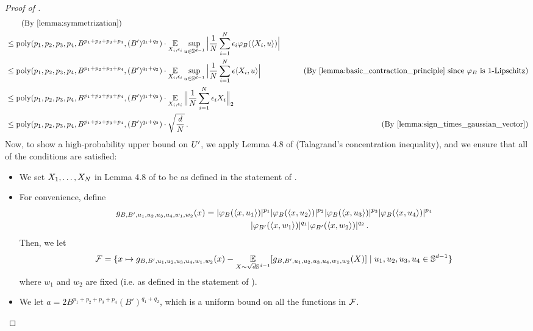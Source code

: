 \begin{proof}[Proof of ]
\begin{align}
& \tag{By \Cref{lemma:symmetrization}} \\
& \leq \poly(p_1, p_2, p_3, p_4, B^{p_1 + p_2 + p_3 + p_4}, (B')^{q_1 + q_2}) \cdot \E_{X_i, \epsilon_i} \sup_{u \in \bbS^{d - 1}} \Big|\frac{1}{N} \sum_{i = 1}^N \epsilon_i \truncB(\langle X_i, u \rangle) \Big| \\
& \leq \poly(p_1, p_2, p_3, p_4, B^{p_1 + p_2 + p_3 + p_4}, (B')^{q_1 + q_2}) \cdot \E_{X_i, \epsilon_i} \sup_{u \in \bbS^{d - 1}} \Big|\frac{1}{N} \sum_{i = 1}^N \epsilon \langle X_i, u \rangle\Big|
& \tag{By \Cref{lemma:basic_contraction_principle} since $\truncB$ is $1$-Lipschitz} \\
& \leq \poly(p_1, p_2, p_3, p_4, B^{p_1 + p_2 + p_3 + p_4}, (B')^{q_1 + q_2}) \cdot \E_{X_i, \epsilon_i} \Big\| \frac{1}{N} \sum_{i = 1}^N \epsilon_i X_i \Big\|_2 \\
& \leq \poly(p_1, p_2, p_3, p_4, B^{p_1 + p_2 + p_3 + p_4}, (B')^{q_1 + q_2}) \cdot \sqrt{\frac{d}{N}} \period
& \tag{By \Cref{lemma:sign_times_gaussian_vector}}
\end{align}
Now, to show a high-probability upper bound on ${U'}$, we apply Lemma 4.8 of \citet{ALPT2009_concentration} (Talagrand's concentration inequality), and we ensure that all of the conditions are satisfied:
\begin{itemize}
    \item We set $X_1, \ldots, X_N$ in Lemma 4.8 of \citet{ALPT2009_concentration} to be as defined in the statement of .
    \item For convenience, define
    \begin{align}
    g_{B, B', u_1, u_2, u_3, u_4, w_1, w_2}(x) & = |{\varphi_B}(\langle x, u_1 \rangle)|^{p_1} |{\varphi_B}(\langle x, u_2 \rangle)|^{p_2} |{\varphi_B}(\langle x, u_3 \rangle)|^{p_3} |{\varphi_B}(\langle x, u_4 \rangle)|^{p_4} \\
    & \,\,\,\,\,\,\,\,\,\,\,\,\,\,\,\,\,\,\,\,\,\,\,\,\,\,\,\,\,\,\,\, |{\varphi_{B'}}(\langle x, w_1 \rangle)|^{q_1} |{\varphi_{B'}}(\langle x, w_2 \rangle)|^{q_2} \,.
    \end{align}
    Then, we let 
    \begin{align}
    \mathcal{F} = \{x \mapsto g_{B, B', u_1, u_2, u_3, u_4, w_1, w_2}(x) - \operatorname*{\mathbb{E}}_{X \sim \sqrt{d} \mathbb{S}^{d - 1}} [g_{B, B', u_1, u_2, u_3, u_4, w_1, w_2}(X)] \mid u_1, u_2, u_3, u_4 \in \mathbb{S}^{d - 1} \} 
    \end{align}
    where $w_1$ and $w_2$ are fixed (i.e. as defined in the statement of ).
    \item We let $a = 2 B^{p_1 + p_2 + p_3 + p_4} (B')^{q_1 + q_2}$, which is a uniform bound on all the functions in $\mathcal{F}$.

\end{itemize}
\end{proof}
